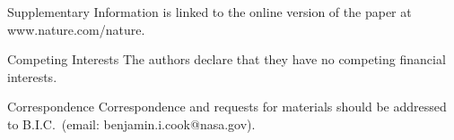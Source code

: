 \documentclass{nature}
\begin{document}





\begin{addendum}
 \item [Supplementary Information] is linked to the online version of the paper at www.nature.com/nature.
 \item[Competing Interests] The authors declare that they have no
competing financial interests.
 \item[Correspondence] Correspondence and requests for materials
should be addressed to B.I.C.~(email: benjamin.i.cook@nasa.gov).
\end{addendum}
\end{document}
